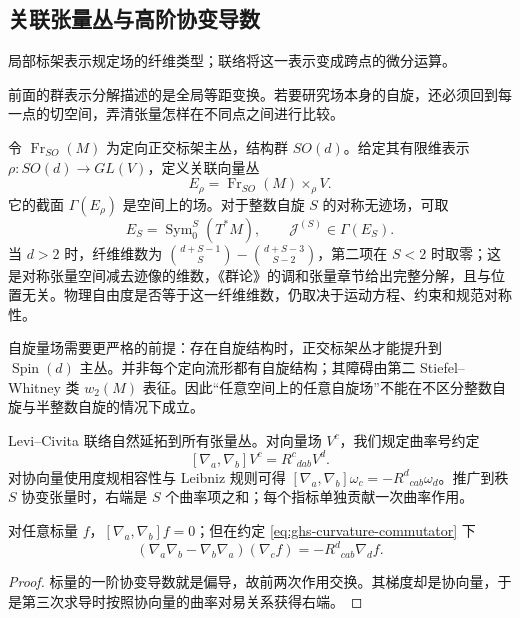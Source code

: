 \subsection{关联张量丛与高阶协变导数}

局部标架表示规定场的纤维类型；联络将这一表示变成跨点的微分运算。

前面的群表示分解描述的是全局等距变换。若要研究场本身的自旋，还必须回到每一点的切空间，弄清张量怎样在不同点之间进行比较。

令 $\operatorname{Fr}_{SO}(M)$ 为定向正交标架主丛，结构群 $SO(d)$。给定其有限维表示 $\rho:SO(d)\to GL(V)$，定义关联向量丛
\begin{equation}\label{eq:ghs-associated-vector-bundle}
 E_\rho=\operatorname{Fr}_{SO}(M)\times_\rho V.
\end{equation}
它的截面 $\Gamma(E_\rho)$ 是空间上的场。对于整数自旋 $S$ 的对称无迹场，可取
\[
 E_S=\operatorname{Sym}^S_0(T^*M),\qquad
 \mathcal J^{(S)}\in\Gamma(E_S).
\]
当 $d>2$ 时，纤维维数为 $\binom{d+S-1}{S}-\binom{d+S-3}{S-2}$，第二项在 $S<2$ 时取零；这是对称张量空间减去迹像的维数，《群论》的调和张量章节给出完整分解，且与位置无关。物理自由度是否等于这一纤维维数，仍取决于运动方程、约束和规范对称性。

自旋量场需要更严格的前提：存在自旋结构时，正交标架丛才能提升到 $\operatorname{Spin}(d)$ 主丛。并非每个定向流形都有自旋结构；其障碍由第二 Stiefel--Whitney 类 $w_2(M)$ 表征。因此“任意空间上的任意自旋场”不能在不区分整数自旋与半整数自旋的情况下成立。

Levi--Civita 联络自然延拓到所有张量丛。对向量场 $V^c$，我们规定曲率号约定
\begin{equation}\label{eq:ghs-curvature-commutator}
 [\nabla_a,\nabla_b]V^c=R^c{}_{dab}V^d.
\end{equation}
对协向量使用度规相容性与 Leibniz 规则可得
$[\nabla_a,\nabla_b]\omega_c=-R^d{}_{cab}\omega_d$。推广到秩 $S$ 协变张量时，右端是 $S$ 个曲率项之和；每个指标单独贡献一次曲率作用。

\begin{proposition}[标量二阶导数与三阶导数]
对任意标量 $f$，$[\nabla_a,\nabla_b]f=0$；但在约定 \cref{eq:ghs-curvature-commutator} 下
\begin{equation}\label{eq:ghs-scalar-third-derivative}
 (\nabla_a\nabla_b-\nabla_b\nabla_a)(\nabla_cf)
 =-R^d{}_{cab}\nabla_df.
\end{equation}
\end{proposition}
\begin{proof}
标量的一阶协变导数就是偏导，故前两次作用交换。其梯度却是协向量，于是第三次求导时按照协向量的曲率对易关系获得右端。
\end{proof}

